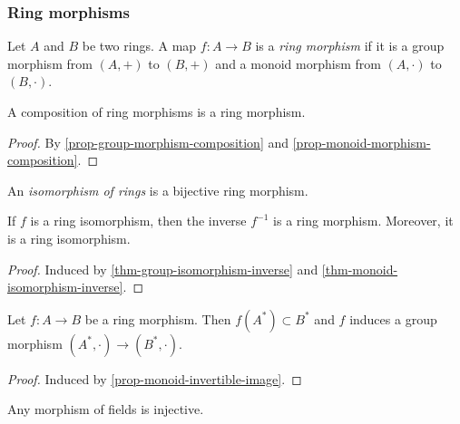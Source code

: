 \documentclass[12pt]{report}
\begin{document}
\subsubsection{Ring morphisms}

\begin{definition} \label{def-ring-morphism}
    Let $A$ and $B$ be two rings. A map $f \colon A \to B$ is a \emph{ring morphism} if it is a group morphism from $(A, +)$ to $(B, +)$ and a monoid morphism from $(A, \cdot)$ to $(B, \cdot)$.
\end{definition}

\begin{proposition} \label{prop-ring-morphism-composition}
    A composition of ring morphisms is a ring morphism.
\end{proposition}

\begin{proof}
    By \ref{prop-group-morphism-composition} and \ref{prop-monoid-morphism-composition}.
\end{proof}

\begin{definition} \label{def-ring-isomorphism}
    An \emph{isomorphism of rings} is a bijective ring morphism.
\end{definition}

\begin{theorem} \label{thm-ring-isomorphism-inverse}
    If $f$ is a ring isomorphism, then the inverse $f^{-1}$ is a ring morphism. Moreover, it is a ring isomorphism.
\end{theorem}

\begin{proof}
    Induced by \ref{thm-group-isomorphism-inverse} and \ref{thm-monoid-isomorphism-inverse}.
\end{proof}

\begin{proposition} \label{prop-ring-invertible-image}
    Let $f \colon A \to B$ be a ring morphism. Then $f(A^{\ast}) \subset B^{\ast}$ and $f$ induces a group morphism $(A^{\ast}, \cdot) \to (B^{\ast}, \cdot)$.
\end{proposition}

\begin{proof}
    Induced by \ref{prop-monoid-invertible-image}.
\end{proof}

\begin{proposition} \label{prop-field-morphism-injectivity}
    Any morphism of fields is injective.
\end{proposition}
\end{document}
